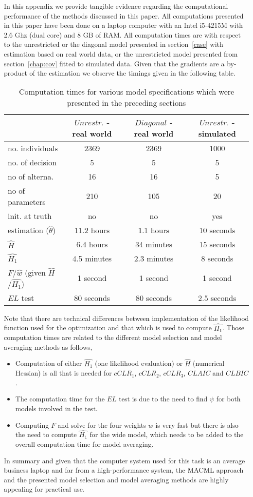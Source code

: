 \documentclass[12pt, a4paper]{article}
\numberwithin{defcounter}{section}
\numberwithin{excounter}{section}
\begin{document}
In this appendix we provide tangible evidence regarding the computational performance of the methods discussed in this paper. All computations presented in this paper have been done on a laptop computer with an Intel i5-4215M with 2.6 Ghz (dual core) and 8 GB of RAM. All computation times are with respect to the unrestricted or the diagonal model presented in section~\ref{case} with estimation based on real world data, or the unrestricted model presented from section~\ref{chap:cov} fitted to simulated data. Given that the gradients are a by-product of the estimation we observe the timings given in the following table.
\begin{table}[H]
\centering
\caption{Computation times for various model specifications which were presented in the preceding sections}
\begin{tabular} 
 {l    *{3}{c} } 
 & $Unrestr.$ - real world  & $Diagonal$ - real world  & $Unrestr.$ - simulated \\ \hline \hline
no. individuals & 2369 & 2369 & 1000\\
no. of decision & 5 & 5 & 5\\
no of alterna. & 16 & 16 & 5\\
no of parameters & 210 & 105 & 20 \\
init. at truth & no & no & yes\\
\hline \hline
estimation ($\hat{\theta}$) & 11.2 hours & 1.1 hours & 10 seconds \\
$\hat{H}$ & 6.4 hours & 34 minutes & 15 seconds \\
$\hat{H_1}$ & 4.5 minutes & 2.3 minutes & 8 seconds \\
$F$/$\hat{w}$ (given $\hat{H}$/$\hat{H_1}$) & 1 second & 1 second & 1 second\\
$EL$ test & 80 seconds & 80 seconds & 2.5 seconds\\
\hline \hline
 \end{tabular} 

\end{table}
Note that there are technical differences between implementation of the likelihood function used for the optimization and that which is used to compute $\hat{H_1}$. Those computation times are related to the different model selection and model averaging methods as follows,

\begin{itemize}
\item Computation of either $\hat{H_1}$ (one likelihood evaluation) or $\hat{H}$ (numerical Hessian) is all that is needed for $cCLR_1$, $cCLR_2$, $cCLR_3$, $CLAIC$ and $CLBIC$.
\item The computation time for the $EL$ test is  due to the need to find $\psi$ for both models involved in the test.
\item Computing $F$ and solve for the four weights $w$ is very fast but there is also the need to compute $\hat{H_1}$ for the wide model, which needs to be added to the overall computation time for model averaging.
\end{itemize}
 

In summary and given that the computer system used for this task is an average business laptop and far from a high-performance system, the \ac{MACML} approach and the presented model selection and model averaging methods are highly appealing for practical use.
\end{document}
